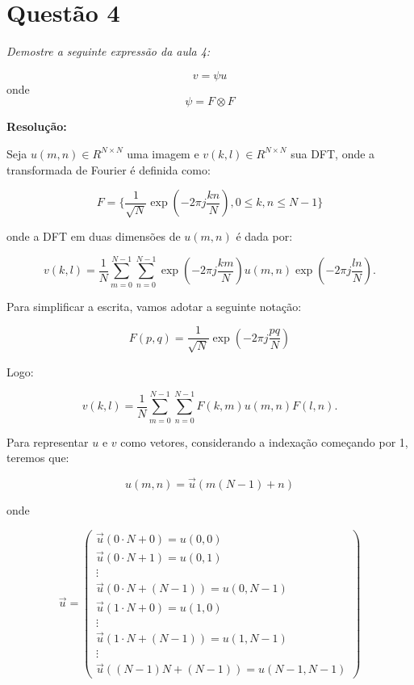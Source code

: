 \documentclass[]{abntex2}
\begin{document}
\section*{\textbf{Questão 4}}

\textit{Demostre a seguinte expressão da aula 4:}

\begin{equation*}
	v = \psi u
\end{equation*}
onde
\begin{equation*}
	\psi = F \otimes F
\end{equation*}

\textbf{Resolução:}

Seja $u(m,n)\in R^{N \times N}$ uma imagem e $v(k,l)\in R^{N \times N}$ sua DFT, onde a transformada de Fourier é definida como:

\begin{equation*}
	F=\{\dfrac{1}{\sqrt{N}}\exp(-2\pi j \dfrac{kn}{N}), 0 \leq k,n \leq N-1\}
\end{equation*}

onde a DFT em duas dimensões de $u(m,n)$ é dada por:

\begin{equation*}
	v(k,l) = \dfrac{1}{N} \sum_{m = 0}^{N-1} \sum_{n = 0}^{N-1} \exp(-2\pi j \dfrac{km}{N}) u(m,n)\exp(-2\pi j \dfrac{ln}{N}).
\end{equation*}

Para simplificar a escrita, vamos adotar a seguinte notação:

\begin{equation*}
	F(p,q) = \dfrac{1}{\sqrt{N}}\exp(-2\pi j \dfrac{pq}{N})
\end{equation*}

Logo:

\begin{equation*}
	v(k,l) = \dfrac{1}{N} \sum_{m = 0}^{N-1} \sum_{n = 0}^{N-1} F(k,m) u(m,n)F(l,n).
\end{equation*}

Para representar $u$ e $v$ como vetores, considerando a indexação começando por 1, teremos que:

\begin{equation*}
	u(m,n) = \vec{u}(m(N-1)+n)
\end{equation*}

onde

\begin{equation*}
	\vec{u} = \begin{pmatrix}
		\vec{u}(0\cdot N+0) = u(0,0) \\
		\vec{u}(0\cdot N+1) = u(0,1) \\
		\vdots \\
		\vec{u}(0\cdot N+(N-1)) = u(0,N-1) \\
		\vec{u}(1\cdot N + 0) = u(1,0) \\
		\vdots \\
		\vec{u}(1\cdot N+(N-1)) = u(1,N-1)\\
		\vdots \\
		\vec{u}((N-1)N + (N-1)) = u(N-1,N-1)
		\end{pmatrix}
\end{equation*}
\end{document}
